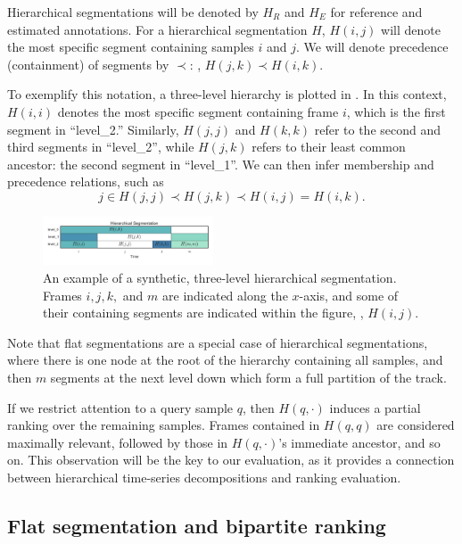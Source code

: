\documentclass{article}
\begin{document}
Hierarchical segmentations will be denoted by $H_R$ and $H_E$ for reference and estimated annotations.
For a hierarchical segmentation $H$, $H(i,j)$ will denote the most specific segment containing samples $i$ and $j$.
We will denote precedence (containment) of segments by $\prec$: \eg, $H(j, k) \prec H(i, k)$.

To exemplify this notation, a three-level hierarchy is plotted in .
In this context, $H(i, i)$ denotes the most specific segment containing frame $i$, which is the first segment in ``level\_2.''
Similarly, $H(j,j)$ and $H(k,k)$ refer to the second and third segments in  ``level\_2'',
while $H(j,k)$ refers to their least common ancestor: the second segment in ``level\_1''.
We can then infer membership and precedence relations, such as
\begin{equation}
j \in H(j, j) \prec H(j, k) \prec H(i, j) = H(i, k).
\end{equation}


\begin{figure}
  \centering
  \includegraphics[width=0.45\textwidth]{figs/hier-example.pdf}
  \caption{An example of a synthetic, three-level hierarchical segmentation.
  Frames $i, j, k,$ and $m$ are indicated along the $x$-axis, and some of their containing segments are indicated within the figure, \eg, $H(i, j)$.}
  \label{fig:hier-example}
\end{figure}

Note that flat segmentations are a special case of hierarchical segmentations, where there is one node at the root of the hierarchy containing all samples, and then $m$ segments at the next level down which form a full partition of the track.

If we restrict attention to a query sample $q$, then $H(q, \cdot)$ induces a partial ranking over the remaining samples.
Frames contained in $H(q, q)$ are considered maximally relevant, followed by those in $H(q, \cdot)$'s immediate ancestor, and so on.
This observation will be the key to our evaluation, as it provides a connection between hierarchical time-series decompositions and ranking evaluation.

\subsection{Flat segmentation and bipartite ranking}
\end{document}
